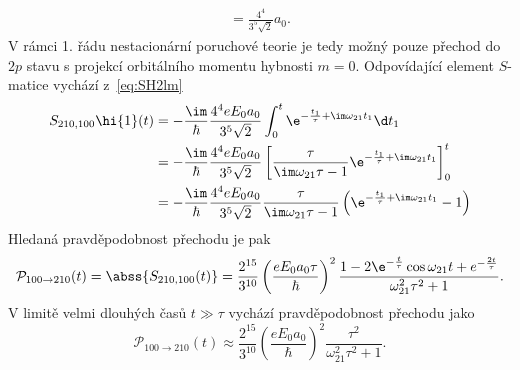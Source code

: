 \begin{solution}
\begin{subequations}
\begin{align}
                =\frac{4^{4}}{3^{5}\sqrt{2}}a_{0}.
        \end{align}            
    \end{subequations}
    V rámci 1. řádu nestacionární poruchové teorie je tedy možný pouze přechod do $2p$ stavu s projekcí orbitálního momentu hybnosti $m=0$.
    Odpovídající element $S$-matice vychází z~\eqref{eq:SH2lm}
    \begin{align}
        S_{210,100}\hi{1}(t)
            &=-\frac{\im}{\hbar}\frac{4^{4}eE_{0}a_{0}}{3^{5}\sqrt{2}}\int_{0}^{t}\e^{-\frac{t_{1}}{\tau}+\im\omega_{21}t_{1}}\d t_{1}\nonumber\\
            &=-\frac{\im}{\hbar}\frac{4^{4}eE_{0}a_{0}}{3^{5}\sqrt{2}}\left[\frac{\tau}{\im\omega_{21}\tau-1}\e^{-\frac{t_{1}}{\tau}+\im\omega_{21}t_{1}}\right]_{0}^{t}\nonumber\\
            &=-\frac{\im}{\hbar}\frac{4^{4}eE_{0}a_{0}}{3^{5}\sqrt{2}}\frac{\tau}{\im\omega_{21}\tau-1}\left(\e^{-\frac{t_{1}}{\tau}+\im\omega_{21}t_{1}}-1\right)
    \end{align}
    Hledaná pravděpodobnost přechodu je pak
    \begin{equation}
        \mathcal{P}_{100\rightarrow210}(t)
            =\abss{S_{210,100}(t)}
            =\frac{2^{15}}{3^{10}}\left(\frac{eE_{0}a_{0}\tau}{\hbar}\right)^{2}\frac{1-2\e^{-\frac{t}{\tau}}\cos{\omega_{21}t}+e^{-\frac{2t}{\tau}}}{\omega_{21}^{2}\tau^{2}+1}.
    \end{equation}
    V limitě velmi dlouhých časů $t\gg\tau$ vychází pravděpodobnost přechodu jako
    \begin{equation}
        \mathcal{P}_{100\rightarrow210}(t)
            \approx\frac{2^{15}}{3^{10}}\left(\frac{eE_{0}a_{0}}{\hbar}\right)^{2}\frac{\tau^{2}}{\omega_{21}^{2}\tau^{2}+1}.
    \end{equation}
\end{solution}